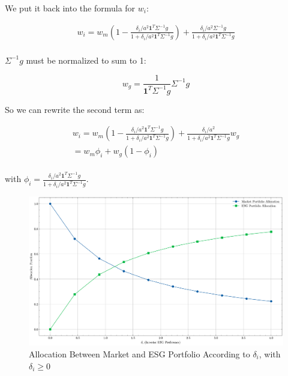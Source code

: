 We put it back into the formula for $w_i$:

\begin{equation}
    \begin{aligned}
        w_i = w_m (1 - \frac{\delta_i / a^2 \mathbf{1}^T \Sigma^{-1}g}{1 + \delta_i / a^2 \mathbf{1}^T \Sigma^{-1}g}) + \frac{\delta_i / a^2 \Sigma^{-1}g}{1 + \delta_i / a^2 \mathbf{1}^T \Sigma^{-1}g} \\
        \end{aligned}
\end{equation}

$\Sigma^{-1}g$ must be normalized to sum to 1:

\begin{equation}
    w_g = \frac{1}{\mathbf{1}^T \Sigma^{-1} g} \Sigma^{-1} g
\end{equation}

So we can rewrite the second term as:

\begin{equation}
    \begin{aligned}
        w_i = w_m (1 - \frac{\delta_i / a^2 \mathbf{1}^T \Sigma^{-1}g}{1 + \delta_i / a^2 \mathbf{1}^T \Sigma^{-1}g}) + \frac{\delta_i / a^2}{1 + \delta_i / a^2 \mathbf{1}^T \Sigma^{-1}g} w_g \\
        = w_m \phi_i + w_g (1 - \phi_i) \\
    \end{aligned}
\end{equation}


with $\phi_i = \frac{\delta_i / a^2 \mathbf{1}^T \Sigma^{-1}g}{1 + \delta_i / a^2 \mathbf{1}^T \Sigma^{-1}g}$.

\begin{figure}
    \centering
    \includegraphics[width=1\textwidth]{../images/chapter01/allocation_fractions_vs_delta_i.png}
    \caption{Allocation Between Market and ESG Portfolio According to $\delta_i$,
    with $\delta_i \geq 0$}
    \label{fig:portfolio_tilts}
\end{figure}

